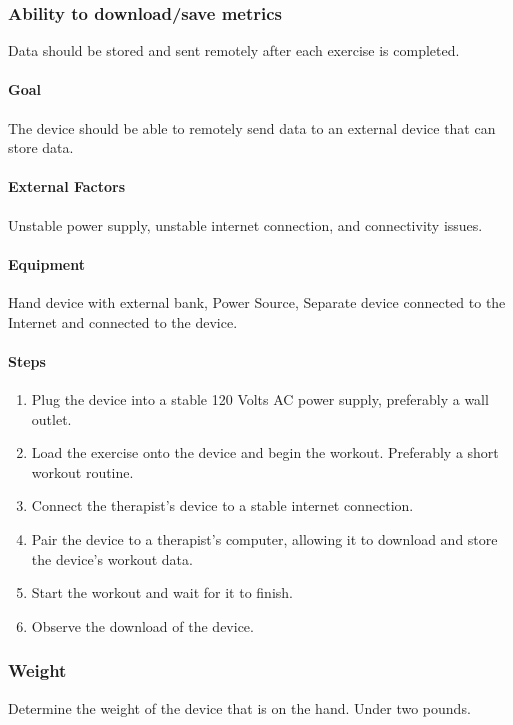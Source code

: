 \documentclass{article}
\begin{document}
\subsubsection{Ability to download/save metrics}
Data should be stored and sent remotely after each exercise is completed.

\paragraph{Goal} The device should be able to remotely send data to an external device that can store data.

\paragraph{External Factors} Unstable power supply, unstable internet connection, and connectivity issues.

\paragraph{Equipment} Hand device with external bank, Power Source, Separate device connected to the Internet and connected to the device.

\paragraph{Steps}
\begin{enumerate}
\item Plug the device into a stable 120 Volts AC power supply, preferably a wall outlet.
\item Load the exercise onto the device and begin the workout. Preferably a short workout routine.
\item Connect the therapist's device to a stable internet connection.
\item Pair the device to a therapist's computer, allowing it to download and store the device's workout data.
\item Start the workout and wait for it to finish.
\item Observe the download of the device.
\end{enumerate}

\subsubsection{Weight}
Determine the weight of the device that is on the hand. Under two pounds.
\end{document}
